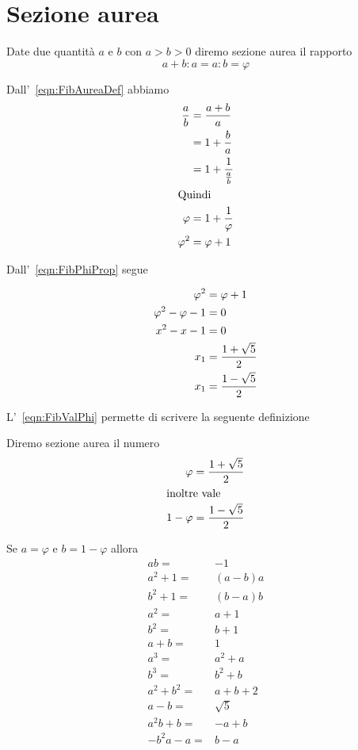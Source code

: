 \section{Sezione aurea}
\begin{defn}
	Date due quantità $a$ e $b$ con $a>b>0$ diremo sezione aurea il rapporto
	\begin{equation}
	a+b:a=a:b=\varphi	
	\end{equation}\label{eqn:FibAureaDef}
\end{defn}
\begin{prop}
	Dall'~\vref{eqn:FibAureaDef} abbiamo
	\begin{align}
		\dfrac{a}{b}={}&\dfrac{a+b}{a}\notag\\
		={}&1+\dfrac{b}{a}\notag\\
		={}&1+\dfrac{1}{\frac{a}{b}}\notag\\
		\intertext{Quindi}
		\varphi={}&1+\dfrac{1}{\varphi}\label{eqn:FibPhiProp}\\
		\varphi^2={}&\varphi+1\notag
	\end{align}
\end{prop}
	Dall'~\vref{eqn:FibPhiProp} segue
	\begin{prop}
	\begin{align}
		\varphi^2={}&\varphi+1\notag\\
		\varphi^2-\varphi-1={}&0\notag\\
		x^2-x-1={}&0\label{eqn:FibValPhiEqua}\\
		x_1={}&\dfrac{1+\sqrt{5}}{2}\label{eqn:FibValPhi}\\
		x_1={}&\dfrac{1-\sqrt{5}}{2}\notag
	\end{align}
\end{prop}
L'~\vref{eqn:FibValPhi} permette di scrivere la seguente definizione
\begin{defn}
Diremo sezione aurea il numero
\begin{align*}
	\varphi={}&\dfrac{1+\sqrt{5}}{2}\\
\intertext{inoltre vale}
	1-	\varphi={}&\dfrac{1-\sqrt{5}}{2}\\
\end{align*}
\end{defn}
\begin{lem}[Proprietà]\label{lem:FibpropPhi}
	Se $a=\varphi$ e  $b=1-\varphi$ allora
	\begin{align*}
		ab={}&-1\\
		a^2+1={}&(a-b)a\\
		b^2+1={}&(b-a)b\\
		a^2={}&a+1\\
		b^2={}&b+1\\
		a+b={}&1\\
		a^3={}&a^2+a\\
		b^3={}&b^2+b\\
		a^2+b^2={}&a+b+2\\
	a-b={}&\sqrt{5}\\
	a^2b+b={}&-a+b\\
	-b^2a-a={}&b-a\\
		\end{align*}
\end{lem}
